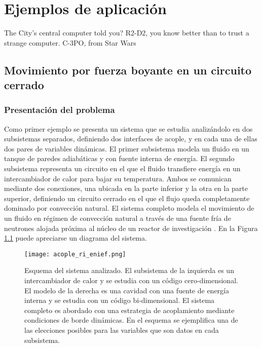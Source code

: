 \chapter{Ejemplos de aplicación}
\label{chap3}
\chapterquote
{The City's central computer told you? R2-D2, you know better than to trust a strange computer. }
{C-3PO, from Star Wars}

\section{Movimiento por fuerza boyante en un circuito cerrado}
\label{3:ff}

\subsection*{Presentación del problema}
Como primer ejemplo se presenta un sistema que se estudia analizándolo en dos subsistemas separados,
definiendo dos interfaces de acople,
y en cada una de ellas dos pares de variables dinámicas.
El primer subsistema modela un fluido en un tanque de paredes adiabáticas y con fuente interna de energía. 
El segundo subsistema representa un circuito en el que el fluido transfiere energía en un intercambiador de calor para bajar su temperatura.
Ambos se comunican mediante dos conexiones, una ubicada en la parte inferior y la otra en la parte superior,
definiendo un circuito cerrado en el que el flujo queda completamente dominado por convección natural.
El sistema completo modela el movimiento de un fluido en régimen de convección natural a través de
una fuente fría de neutrones alojada próxima al núcleo de un reactor de investigación \cite{fuente-fria}.
En la Figura \ref{esquemaFuenteFria} puede apreciarse un diagrama del sistema.

\begin{figure}[ht]
\centering{}\texttt{[image: acople\_ri\_enief.png]}
\caption{Esquema del sistema analizado. 
El subsistema de la izquierda es un intercambiador de calor y se estudia con un código cero-dimensional.
El modelo de la derecha es una cavidad con una fuente de energía interna y se estudia con un código bi-dimensional.
El sistema completo es abordado con una estrategia de acoplamiento mediante condiciones de borde dinámicas.
En el esquema se ejemplifica una de las elecciones posibles para las variables que son datos en cada subsistema.}
\label{esquemaFuenteFria}
\end{figure}

